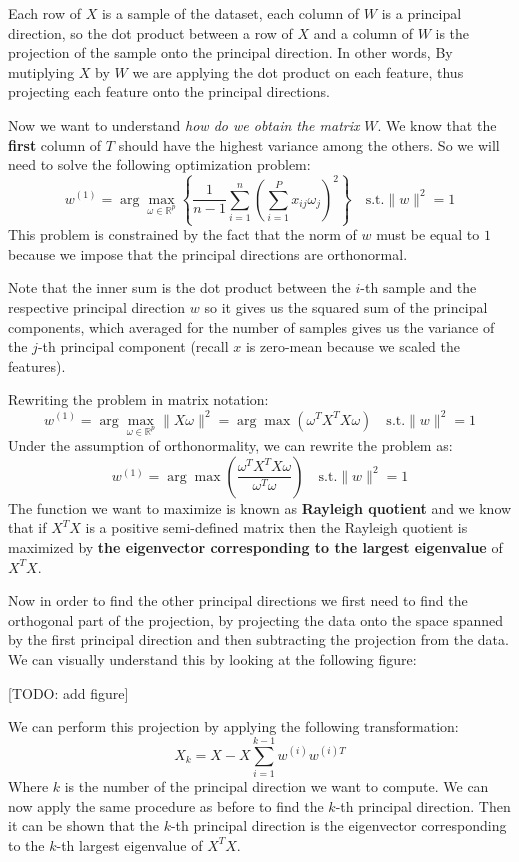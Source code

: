 Each row of $X$ is a sample of the dataset, each column of $W$ is a principal direction, so the dot product between a row of $X$ and a column of $W$ is the projection of the sample onto the principal direction. In other words, By mutiplying $X$ by $W$ we are applying the dot product on each feature, thus projecting each feature onto the principal directions.

Now we want to understand \textit{how do we obtain the matrix} $W$. We know that the \textbf{first} column of $T$ should have the highest variance among the others. So we will need to solve the following optimization problem:
\[
    w^{(1)} = \arg \max_{\omega \in \mathbb{R}^p} \left\{\frac{1}{n-1} \sum_{i = 1}^{n} \left(\sum_{i = 1}^{P} x_{ij} \omega_j \right)^2\right\} \quad \text{s.t.} \|w\|^2 = 1
\]
This problem is constrained by the fact that the norm of $w$ must be equal to $1$ because we impose that the principal directions are orthonormal.

Note that the inner sum is the dot product between the $i$-th sample and the respective principal direction $w$ so it gives us the squared sum of the principal components, which averaged for the number of samples gives us the variance of the $j$-th principal component (recall $x$ is zero-mean because we scaled the features).

Rewriting the problem in matrix notation:
\[
    w^{(1)} = \arg \max_{\omega \in \mathbb{R}^p} \|X\omega\|^2 = \arg \max \left(\omega^T X^T X \omega\right)\quad \text{s.t.} \|w\|^2 = 1
\]
Under the assumption of orthonormality, we can rewrite the problem as:
\[
    w^{(1)} = \arg \max \left(\frac{\omega^T X^T X \omega}{\omega^T \omega}\right)\quad \text{s.t.} \|w\|^2 = 1
\]
The function we want to maximize is known as \textbf{Rayleigh quotient} and we know that if $X^T X$ is a positive semi-defined matrix then the Rayleigh quotient is maximized by \textbf{the eigenvector corresponding to the largest eigenvalue} of $X^T X$.

Now in order to find the other principal directions we first need to find the orthogonal part of the projection, by projecting the data onto the space spanned by the first principal direction and then subtracting the projection from the data. We can visually understand this by looking at the following figure:

[TODO: add figure]

We can perform this projection by applying the following transformation:
\[
    X_k = X - X \sum_{i=1}^{k-1} w^{(i)} w^{(i)T}
\]
Where $k$ is the number of the principal direction we want to compute.  We can now apply the same procedure as before to find the $k$-th principal direction. Then it can be shown that the $k$-th principal direction is the eigenvector corresponding to the $k$-th largest eigenvalue of $X^T X$.

